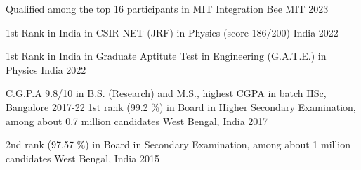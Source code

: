 




\begin{cvhonors}

 \cvhonor
{} %
{Qualified among the top 16 participants in MIT Integration Bee} %
{MIT} %
{2023} %

 \cvhonor
{1st Rank in India} %
{in CSIR-NET (JRF) in Physics (score 186/200)} %
{India} %
{2022} %

 \cvhonor
{1st Rank in India} %
{in Graduate Aptitute Test in Engineering (G.A.T.E.) in Physics} %
{India} %
{2022} %

  \cvhonor
{C.G.P.A} %
{9.8/10 in B.S. (Research) and M.S., highest CGPA in batch} %
{IISc, Bangalore} %
{2017-22} %
  \cvhonor
    {1st rank (99.2 \%) in Board} %
    {in Higher Secondary Examination, among about 0.7 million candidates} %
    {West Bengal, India} %
    {2017} %


	 


  \cvhonor
    {2nd rank (97.57 \%) in Board} %
    {in Secondary Examination, among about 1 million candidates} %
    {West Bengal, India} %
    {2015} %

\end{cvhonors}


